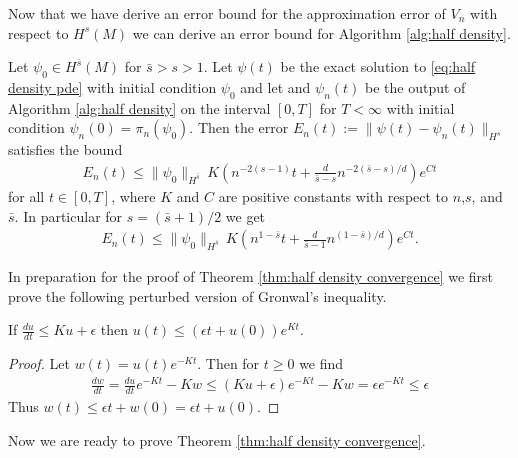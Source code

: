 \documentclass[final,leqno]{siamltex1213}
\begin{document}

Now that we have derive an error bound for the approximation error of $V_{n}$ with respect to $H^{s}(M)$ we can 
derive an error bound for Algorithm \ref{alg:half density}.


\begin{theorem} \label{thm:half density convergence}
	Let $\psi_{0} \in H^{\bar{s}}(M)$ for $\bar{s} > s > 1$.
	Let $\psi(t)$ be the exact solution to \eqref{eq:half density pde} with initial condition $\psi_{0}$ and let
	and $\psi_{n}(t)$ be the output of Algorithm \ref{alg:half density} on the interval $[0,T]$ for $T < \infty$ with initial condition $\psi_{n}(0) = \pi_{n}(\psi_{0})$.
	Then the error $E_{n}(t) := \| \psi(t) - \psi_{n}(t) \|_{H^{s}}$ satisfies the bound
	\begin{align}
		E_{n}(t) \leq \| \psi_{0} \|_{H^{\bar{s}}} \, K \left( n^{-2(s-1)} t+  \frac{d}{\bar{s}-s} n^{-2(\bar{s}-s)/d} \right) e^{C t}
	\end{align}
	for all $t \in [0,T]$, where $K$ and $C$ are positive constants with respect to $n$,$s$, and $\bar{s}$.
	In particular for $s = (\bar{s}+1)/2$ we get
	\begin{align}
			E_{n}(t) \leq \| \psi_{0} \|_{H^{\bar{s}}} \, K \left( n^{1-\bar{s}} t+  \frac{d}{\bar{s}-1} n^{(1-\bar{s})/d} \right) e^{C t}.
	\end{align}
\end{theorem}

In preparation for the proof of Theorem \ref{thm:half density convergence} we first prove the following perturbed version of Gronwal's inequality.

\begin{lemma} \label{lem:Gronwall}
If $\frac{du}{dt} \leq Ku + \epsilon$ then $u(t) \leq (\epsilon t + u(0) ) e^{Kt}$.
\end{lemma}
\begin{proof}
	Let $w (t)= u (t) e^{-Kt}$.  Then for $t \geq 0$ we find
	\begin{align}
		\frac{dw}{dt} = \frac{du}{dt} e^{-Kt} - K w \leq (Ku+\epsilon) e^{-Kt} - Kw = \epsilon e^{-Kt} \leq \epsilon
	\end{align}
	Thus $w(t) \leq \epsilon t + w(0) = \epsilon t + u(0)$.
\end{proof}

Now we are ready to prove Theorem \ref{thm:half density convergence}.
\end{document}
